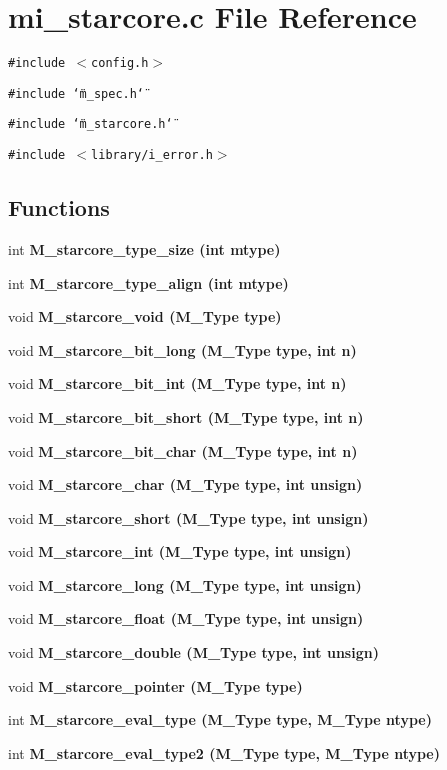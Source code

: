\section{mi\_\-starcore.c File Reference}
\label{mi__starcore_8c}
{\tt \#include $<$config.h$>$}\par
{\tt \#include \char`\"{}m\_\-spec.h\char`\"{}}\par
{\tt \#include \char`\"{}m\_\-starcore.h\char`\"{}}\par
{\tt \#include $<$library/i\_\-error.h$>$}\par
\subsection*{Functions}
\begin{CompactItemize}
\item 
int \bf{M\_\-starcore\_\-type\_\-size} (int mtype)
\item 
int \bf{M\_\-starcore\_\-type\_\-align} (int mtype)
\item 
void \bf{M\_\-starcore\_\-void} (\bf{M\_\-Type} type)
\item 
void \bf{M\_\-starcore\_\-bit\_\-long} (\bf{M\_\-Type} type, int n)
\item 
void \bf{M\_\-starcore\_\-bit\_\-int} (\bf{M\_\-Type} type, int n)
\item 
void \bf{M\_\-starcore\_\-bit\_\-short} (\bf{M\_\-Type} type, int n)
\item 
void \bf{M\_\-starcore\_\-bit\_\-char} (\bf{M\_\-Type} type, int n)
\item 
void \bf{M\_\-starcore\_\-char} (\bf{M\_\-Type} type, int unsign)
\item 
void \bf{M\_\-starcore\_\-short} (\bf{M\_\-Type} type, int unsign)
\item 
void \bf{M\_\-starcore\_\-int} (\bf{M\_\-Type} type, int unsign)
\item 
void \bf{M\_\-starcore\_\-long} (\bf{M\_\-Type} type, int unsign)
\item 
void \bf{M\_\-starcore\_\-float} (\bf{M\_\-Type} type, int unsign)
\item 
void \bf{M\_\-starcore\_\-double} (\bf{M\_\-Type} type, int unsign)
\item 
void \bf{M\_\-starcore\_\-pointer} (\bf{M\_\-Type} type)
\item 
int \bf{M\_\-starcore\_\-eval\_\-type} (\bf{M\_\-Type} type, \bf{M\_\-Type} ntype)
\item 
int \bf{M\_\-starcore\_\-eval\_\-type2} (\bf{M\_\-Type} type, \bf{M\_\-Type} ntype)

\end{CompactItemize}
